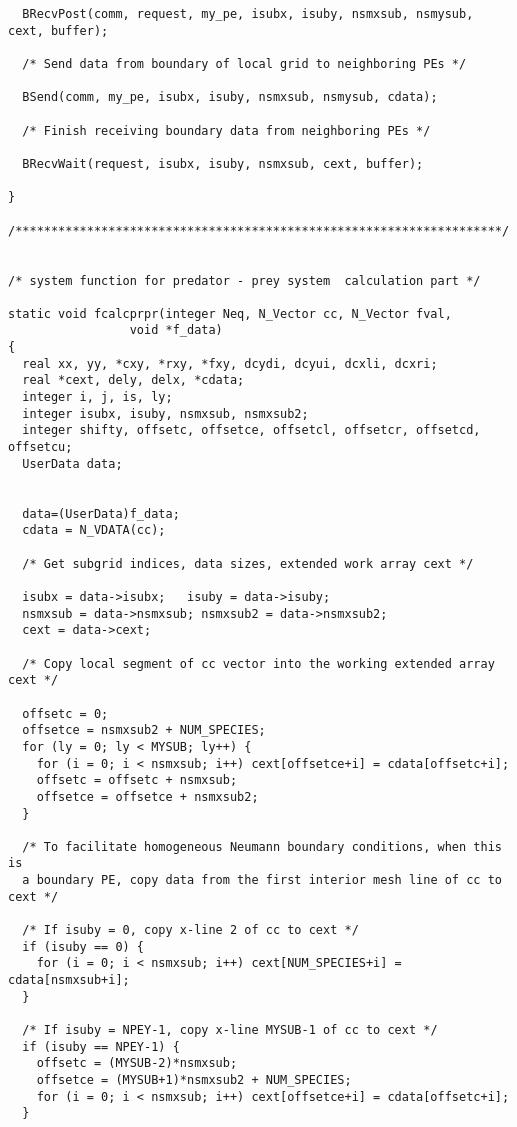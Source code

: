 \begin{verbatim}
  BRecvPost(comm, request, my_pe, isubx, isuby, nsmxsub, nsmysub, cext, buffer);

  /* Send data from boundary of local grid to neighboring PEs */

  BSend(comm, my_pe, isubx, isuby, nsmxsub, nsmysub, cdata);

  /* Finish receiving boundary data from neighboring PEs */

  BRecvWait(request, isubx, isuby, nsmxsub, cext, buffer);

}

/********************************************************************/


/* system function for predator - prey system  calculation part */

static void fcalcprpr(integer Neq, N_Vector cc, N_Vector fval, 
	             void *f_data)
{
  real xx, yy, *cxy, *rxy, *fxy, dcydi, dcyui, dcxli, dcxri;
  real *cext, dely, delx, *cdata;
  integer i, j, is, ly;
  integer isubx, isuby, nsmxsub, nsmxsub2;
  integer shifty, offsetc, offsetce, offsetcl, offsetcr, offsetcd, offsetcu;
  UserData data;


  data=(UserData)f_data;
  cdata = N_VDATA(cc);

  /* Get subgrid indices, data sizes, extended work array cext */

  isubx = data->isubx;   isuby = data->isuby;
  nsmxsub = data->nsmxsub; nsmxsub2 = data->nsmxsub2;
  cext = data->cext;

  /* Copy local segment of cc vector into the working extended array cext */

  offsetc = 0;
  offsetce = nsmxsub2 + NUM_SPECIES;
  for (ly = 0; ly < MYSUB; ly++) {
    for (i = 0; i < nsmxsub; i++) cext[offsetce+i] = cdata[offsetc+i];
    offsetc = offsetc + nsmxsub;
    offsetce = offsetce + nsmxsub2;
  }

  /* To facilitate homogeneous Neumann boundary conditions, when this is
  a boundary PE, copy data from the first interior mesh line of cc to cext */

  /* If isuby = 0, copy x-line 2 of cc to cext */
  if (isuby == 0) {
    for (i = 0; i < nsmxsub; i++) cext[NUM_SPECIES+i] = cdata[nsmxsub+i];
  }

  /* If isuby = NPEY-1, copy x-line MYSUB-1 of cc to cext */
  if (isuby == NPEY-1) {
    offsetc = (MYSUB-2)*nsmxsub;
    offsetce = (MYSUB+1)*nsmxsub2 + NUM_SPECIES;
    for (i = 0; i < nsmxsub; i++) cext[offsetce+i] = cdata[offsetc+i];
  }


\end{verbatim}
